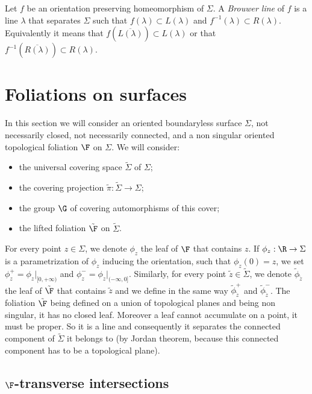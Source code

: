 Let $f$ be an orientation preserving homeomorphism of $\Sigma$. A \emph{Brouwer line} of $f$ is a line $\lambda$ that separates $\Sigma$ such that $f(\lambda)\subset L(\lambda)$ and $f^{-1}(\lambda)\subset R(\lambda)$. Equivalently it means that $f(\overline {L(\lambda)})\subset L(\lambda)$ or that $f^{-1}(\overline {R(\lambda)})\subset R(\lambda)$.


\section{Foliations on surfaces}\label{s.foliations}



In this section we will consider an oriented boundaryless surface $\Sigma$, not necessarily closed, not necessarily connected, and a non singular oriented topological foliation $\F$ on $\Sigma$. We will consider:
\begin{itemize}
\item the universal covering space $\tilde\Sigma$ of $\Sigma$;
\item the covering projection $\tilde\pi: \tilde\Sigma\to \Sigma$;
\item the group ${\G}$ of covering automorphisms of this cover;
\item the lifted foliation $\tilde{\F}$ on $\tilde{\Sigma}$.
\end{itemize}

For every point $z\in\Sigma$, we denote $\phi_{z}$ the leaf of $\F$ that contains $z$. If $\phi_z:\R\to\Sigma$ is a parametrization of $\phi_z$ inducing the orientation, such that $\phi_z(0)=z$, we set $\phi_z^+=\phi_z\vert_{[0,+\infty)}$ and $\phi_z^-=\phi_z\vert_{(-\infty,0]}$. Similarly, for every point $\tilde z\in\tilde\Sigma$, we denote $\tilde\phi_{\tilde z}$ the leaf of $\tilde{\F}$ that contains $\tilde z$ and we define in the same way $\tilde\phi_{\tilde z}^+$ and $\tilde\phi_{\tilde z}^-$. The foliation $\tilde{\F}$ being defined on a union of topological planes and being non singular, it has no closed leaf. Moreover a leaf cannot accumulate on a point, it must be proper. So it is a line and consequently it separates the connected component of $\tilde{\Sigma}$ it belongs to (by Jordan theorem, because this connected component has to be a topological plane).



\subsection{\texorpdfstring{$\F$}{F}-transverse intersections}\label{ss.intersections}


